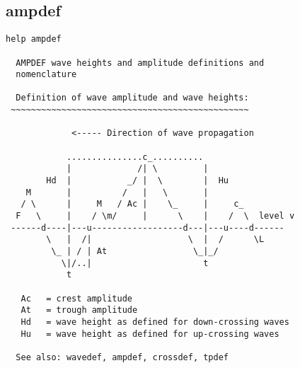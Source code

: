 \subsection{ampdef}
{\small\begin{verbatim}
help ampdef

  AMPDEF wave heights and amplitude definitions and
  nomenclature

  Definition of wave amplitude and wave heights:
 ~~~~~~~~~~~~~~~~~~~~~~~~~~~~~~~~~~~~~~~~~~~~~~~

             <----- Direction of wave propagation

            ...............c_..........
            |             /| \         |
        Hd  |           _/ |  \        |  Hu
    M       |          /   |   \       |
   / \      |     M   / Ac |    \_     |     c_
  F   \     |    / \m/     |      \    |    /  \  level v
 ------d----|---u------------------d---|---u----d------
        \   |  /|                   \  |  /      \L
         \_ | / | At                 \_|_/
           \|/..|                      t
            t

   Ac   = crest amplitude
   At   = trough amplitude
   Hd   = wave height as defined for down-crossing waves
   Hu   = wave height as defined for up-crossing waves

  See also: wavedef, ampdef, crossdef, tpdef
\end{verbatim}
    }

  \newpage
